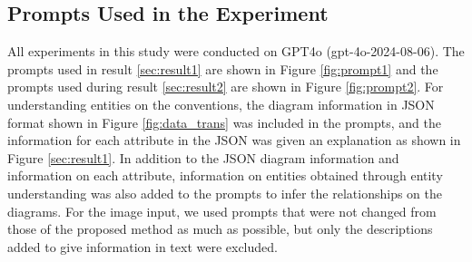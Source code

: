 \subsection{Prompts Used in the Experiment}

All experiments in this study were conducted on GPT4o \citep{openai_gpt-4o_2024} (gpt-4o-2024-08-06).
The prompts used in result \ref{sec:result1} are shown in Figure \ref{fig:prompt1} and the prompts used during result \ref{sec:result2} are shown in Figure \ref{fig:prompt2}. For understanding entities on the conventions, the diagram information in JSON format shown in Figure \ref{fig:data_trans} was included in the prompts, and the information for each attribute in the JSON was given an explanation as shown in Figure \ref{sec:result1}. In addition to the JSON diagram information and information on each attribute, information on entities obtained through entity understanding was also added to the prompts to infer the relationships on the diagrams. For the image input, we used prompts that were not changed from those of the proposed method as much as possible, but only the descriptions added to give information in text were excluded.
